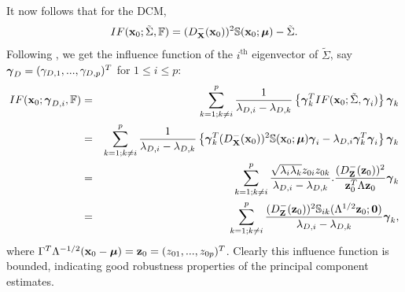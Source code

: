 It now follows that for the DCM,
%
$$
IF({\bf{x}}_0; \tilde \Sigma, {\mathbb{F}}) =
(D^-_{\mathbf{X}}({\bf{x}}_0))^2 {\mathbb{S}}({\bf{x}}_0; {\boldsymbol{\mu}}) - \tilde \Sigma.
$$
%
Following \cite{croux00}, we get the influence function of the $i^\text{th}$ eigenvector of $\tilde \Sigma$, say ${\boldsymbol{\gamma}}_D = (\gamma_{D,1},...,\gamma_{D,p})^T$ for $1 \leq i \leq p$:
%
\begin{eqnarray}
IF({\bf{x}}_0; {\boldsymbol{\gamma}}_{D,i}, {\mathbb{F}}) &=&
\sum_{k=1; k \neq i}^p \frac{1}{\lambda_{D,i} - \lambda_{D,k}} \left\{ {\boldsymbol{\gamma}}^T_k IF({\bf{x}}_0; \tilde \Sigma, {\boldsymbol{\gamma}}_i) \right\} {\boldsymbol{\gamma}}_k \notag \\
&=& \sum_{k=1; k \neq i}^p \frac{1}{\lambda_{D,i} - \lambda_{D,k}}
\left\{ {\boldsymbol{\gamma}}^T_k (D^-_{\mathbf{X}}({\bf{x}}_0))^2 {\mathbb{S}}({\bf{x}}_0; {\boldsymbol{\mu}}){\boldsymbol{\gamma}}_i - \lambda_{D,i}{\boldsymbol{\gamma}}_k^T{\boldsymbol{\gamma}}_i \right\} {\boldsymbol{\gamma}}_k \notag \\
&=& \sum_{k=1; k \neq i}^p \frac{\sqrt{\lambda_i \lambda_k} z_{0i} z_{0k}}{\lambda_{D,i} - \lambda_{D,k}}. \frac{(D^-_{\mathbf{Z}}({\bf{z}}_0))^2 }{{\bf{z}}_0^T \Lambda {\bf{z}}_0} {\boldsymbol{\gamma}}_k \notag\\
&=& \sum_{k=1; k \neq i}^p \frac{(D^-_{\mathbf{Z}}({\bf{z}}_0))^2 {\mathbb{S}}_{ik}(\Lambda^{1/2} {\bf{z}}_0; {\bf 0})}{\lambda_{D,i} - \lambda_{D,k}} {\boldsymbol{\gamma}}_k,
\end{eqnarray}
%
where $\Gamma^T \Lambda^{-1/2} ({\bf{x}}_0 - {\boldsymbol{\mu}}) = {\bf{z}}_0 = (z_{01},...,z_{0p})^T$. Clearly this influence function is bounded, indicating good robustness properties of the principal component estimates.

